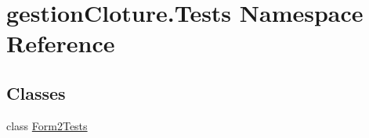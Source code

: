 \hypertarget{namespacegestion_cloture_1_1_tests}{}\section{gestion\+Cloture.\+Tests Namespace Reference}
\label{namespacegestion_cloture_1_1_tests}
\subsection*{Classes}
\begin{DoxyCompactItemize}
\item 
class \mbox{\hyperlink{classgestion_cloture_1_1_tests_1_1_form2_tests}{Form2\+Tests}}
\end{DoxyCompactItemize}
